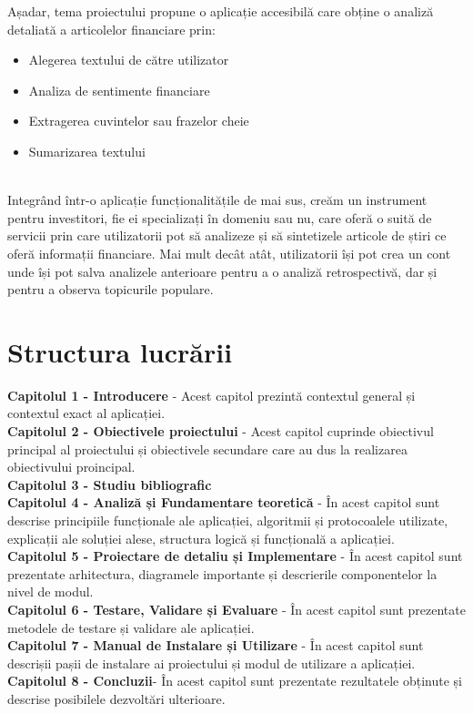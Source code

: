 Așadar, tema proiectului propune o aplicație accesibilă care obține o analiză detaliată a articolelor financiare prin:
\ \\
\begin{itemize}
	\item Alegerea textului de către utilizator
	\item Analiza de sentimente financiare
	\item Extragerea cuvintelor sau frazelor cheie
	\item Sumarizarea textului
\end{itemize}

\ \\
\indent Integrând într-o aplicație funcționalitățile de mai sus, creăm un instrument pentru investitori, fie ei specializați în domeniu sau nu, care oferă o suită de servicii prin care utilizatorii pot să analizeze și să sintetizele articole de știri
ce oferă informații financiare. 
Mai mult decât atât, utilizatorii își pot crea un cont unde își pot salva analizele anterioare pentru a o analiză retrospectivă, dar și pentru a observa topicurile populare.

\section{Structura lucrării}

{\noindent \bf Capitolul 1 - Introducere} - Acest capitol prezintă contextul general și contextul exact al aplicației.\\

{\noindent \bf Capitolul 2 - Obiectivele proiectului} - Acest capitol cuprinde obiectivul principal al proiectului și obiectivele secundare care au dus la realizarea obiectivului proincipal.\\

{\noindent \bf Capitolul 3 - Studiu bibliografic}\\

{\noindent \bf Capitolul 4 - Analiză și Fundamentare teoretică} - În acest capitol sunt descrise principiile funcționale ale aplicației, algoritmii și protocoalele utilizate, explicații ale soluției alese, structura logică și funcțională a aplicației. \\

{\noindent \bf Capitolul 5 - Proiectare de detaliu și Implementare} - În acest capitol sunt prezentate arhitectura, diagramele importante și descrierile componentelor la nivel de modul.\\

{\noindent \bf Capitolul 6 - Testare, Validare și Evaluare} - În acest capitol sunt prezentate metodele de testare și validare ale aplicației.\\

{\noindent \bf Capitolul 7 - Manual de Instalare și Utilizare} - În acest capitol sunt descrișii pașii de instalare ai proiectului și modul de utilizare a aplicației.\\

{\noindent \bf Capitolul 8 - Concluzii}- În acest capitol sunt prezentate rezultatele obținute și descrise posibilele dezvoltări ulterioare.\\

\newpage